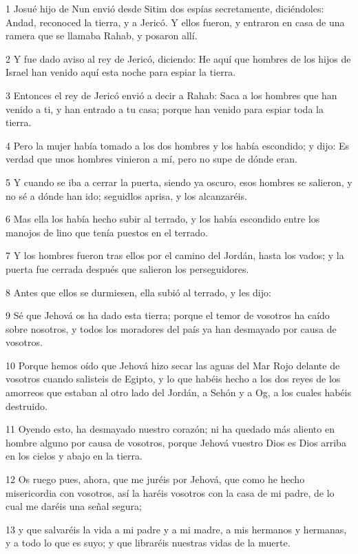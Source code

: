 \par 1 Josué hijo de Nun envió desde Sitim dos espías secretamente, diciéndoles: Andad, reconoced la tierra, y a Jericó. Y ellos fueron, y entraron en casa de una ramera que se llamaba Rahab, y posaron allí.
\par 2 Y fue dado aviso al rey de Jericó, diciendo: He aquí que hombres de los hijos de Israel han venido aquí esta noche para espiar la tierra.
\par 3 Entonces el rey de Jericó envió a decir a Rahab: Saca a los hombres que han venido a ti, y han entrado a tu casa; porque han venido para espiar toda la tierra.
\par 4 Pero la mujer había tomado a los dos hombres y los había escondido; y dijo: Es verdad que unos hombres vinieron a mí, pero no supe de dónde eran.
\par 5 Y cuando se iba a cerrar la puerta, siendo ya oscuro, esos hombres se salieron, y no sé a dónde han ido; seguidlos aprisa, y los alcanzaréis.
\par 6 Mas ella los había hecho subir al terrado, y los había escondido entre los manojos de lino que tenía puestos en el terrado.
\par 7 Y los hombres fueron tras ellos por el camino del Jordán, hasta los vados; y la puerta fue cerrada después que salieron los perseguidores.
\par 8 Antes que ellos se durmiesen, ella subió al terrado, y les dijo:
\par 9 Sé que Jehová os ha dado esta tierra; porque el temor de vosotros ha caído sobre nosotros, y todos los moradores del país ya han desmayado por causa de vosotros.
\par 10 Porque hemos oído que Jehová hizo secar las aguas del Mar Rojo delante de vosotros cuando salisteis de Egipto, y lo que habéis hecho a los dos reyes de los amorreos que estaban al otro lado del Jordán, a Sehón y a Og, a los cuales habéis destruido. 
\par 11 Oyendo esto, ha desmayado nuestro corazón; ni ha quedado más aliento en hombre alguno por causa de vosotros, porque Jehová vuestro Dios es Dios arriba en los cielos y abajo en la tierra.
\par 12 Os ruego pues, ahora, que me juréis por Jehová, que como he hecho misericordia con vosotros, así la haréis vosotros con la casa de mi padre, de lo cual me daréis una señal segura;
\par 13 y que salvaréis la vida a mi padre y a mi madre, a mis hermanos y hermanas, y a todo lo que es suyo; y que libraréis nuestras vidas de la muerte.
